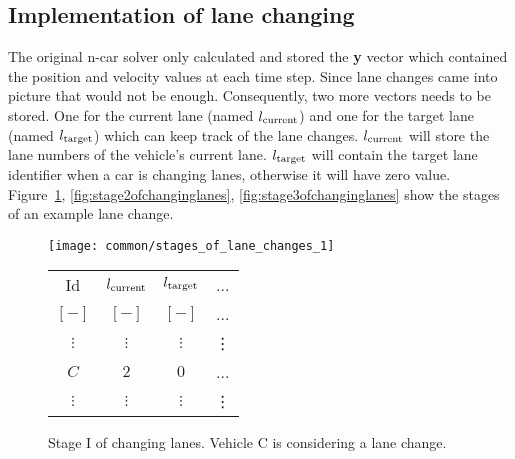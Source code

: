 		\subsection*{Implementation of lane changing}
		The original n-car solver only calculated and stored the \textbf{y} vector which contained the position and velocity values at each time step. Since lane changes came into picture that would not be enough. Consequently, two more vectors needs to be stored. One for the current lane (named $l_{\rm current}$) and one for the target lane (named $l_{\rm target}$) which can keep track of the lane changes. $l_{\rm current}$ will store the lane numbers of the vehicle's current lane. $l_{\rm target}$ will contain the target lane identifier when a car is changing lanes, otherwise it will have zero value. Figure~\ref{fig:stage1ofchanginglanes}, \ref{fig:stage2ofchanginglanes}, \ref{fig:stage3ofchanginglanes} show the stages of an example lane change.
		\begin{figure}
			\begin{center}
				\begin{minipage}{.65\textwidth}
					\texttt{[image: common/stages\_of\_lane\_changes\_1]}
				\end{minipage}\quad
				\begin{minipage}{.3\textwidth}
					\begin{tabular}{ |c|c|c|c| }
						\hline
						Id & $l_{\rm current}$ & $l_{\rm target}$ & ... \\
						$[-]$ & $[-]$ & $[-]$ & ...\\
						\hline
						$\vdots$ & $\vdots$ & $\vdots$ & \vdots\\
						$C$ & $2$ & $0$ & ...\\
						$\vdots$ & $\vdots$ & $\vdots$ & \vdots\\
						\hline
					\end{tabular}
				\end{minipage}
			\end{center}
			\caption{Stage I of changing lanes. Vehicle C is considering a lane change.}
			\label{fig:stage1ofchanginglanes}
		\end{figure}
